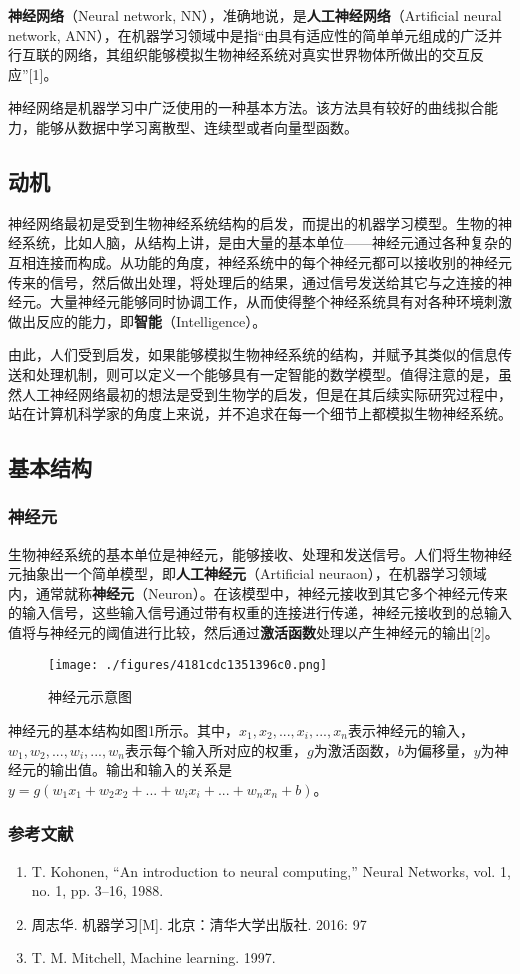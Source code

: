 
\textbf{神经网络}（Neural network, NN），准确地说，是\textbf{人工神经网络}（Artificial neural network, ANN），在机器学习领域中是指“由具有适应性的简单单元组成的广泛并行互联的网络，其组织能够模拟生物神经系统对真实世界物体所做出的交互反应”[1]。

神经网络是机器学习中广泛使用的一种基本方法。该方法具有较好的曲线拟合能力，能够从数据中学习离散型、连续型或者向量型函数。

\subsection{动机}

神经网络最初是受到生物神经系统结构的启发，而提出的机器学习模型。生物的神经系统，比如人脑，从结构上讲，是由大量的基本单位——神经元通过各种复杂的互相连接而构成。从功能的角度，神经系统中的每个神经元都可以接收别的神经元传来的信号，然后做出处理，将处理后的结果，通过信号发送给其它与之连接的神经元。大量神经元能够同时协调工作，从而使得整个神经系统具有对各种环境刺激做出反应的能力，即\textbf{智能}（Intelligence）。

由此，人们受到启发，如果能够模拟生物神经系统的结构，并赋予其类似的信息传送和处理机制，则可以定义一个能够具有一定智能的数学模型。值得注意的是，虽然人工神经网络最初的想法是受到生物学的启发，但是在其后续实际研究过程中，站在计算机科学家的角度上来说，并不追求在每一个细节上都模拟生物神经系统。

\subsection{基本结构}

\subsubsection{神经元}

生物神经系统的基本单位是神经元，能够接收、处理和发送信号。人们将生物神经元抽象出一个简单模型，即\textbf{人工神经元}（Artificial neuraon），在机器学习领域内，通常就称\textbf{神经元}（Neuron）。在该模型中，神经元接收到其它多个神经元传来的输入信号，这些输入信号通过带有权重的连接进行传递，神经元接收到的总输入值将与神经元的阈值进行比较，然后通过\textbf{激活函数}处理以产生神经元的输出[2]。
\begin{figure}[ht]
\centering
\texttt{[image: ./figures/4181cdc1351396c0.png]}
\caption{神经元示意图} \label{fig_NN_1}
\end{figure}
神经元的基本结构如图1所示。其中，$x_1, x_2, ..., x_i, ..., x_n$表示神经元的输入，$w_1, w_2, ..., w_i, ..., w_n$表示每个输入所对应的权重，$g$为激活函数，$b$为偏移量，$y$为神经元的输出值。输出和输入的关系是$y=g(w_1x_1+w_2x_2+...+w_ix_i+...+w_nx_n+b)$。



\subsubsection{参考文献}
\begin{enumerate}
\item T. Kohonen, “An introduction to neural computing,” Neural Networks, vol. 1, no. 1, pp. 3–16, 1988.
\item 周志华. 机器学习[M]. 北京：清华大学出版社. 2016: 97
\item T. M. Mitchell, Machine learning. 1997.
\end{enumerate}